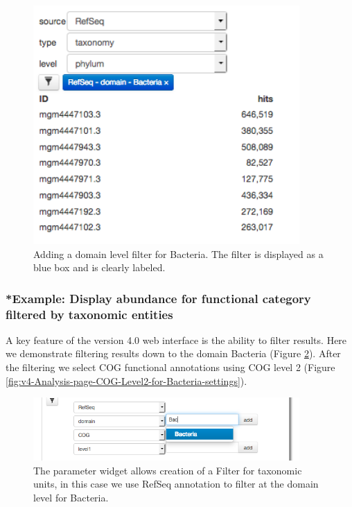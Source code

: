 \documentclass[12pt,fullpage]{report}
\begin{document}
\begin{figure}
\begin{center}
\includegraphics[width=4in]{Images/v4-analysis-page-domain-filter.png}
\end{center}
\caption{
Adding a domain level filter for Bacteria. The filter is displayed as a blue box and is clearly labeled.
}
\label{fig:v4-analysis-page-domain-filter}
\end{figure}


\subsubsection{*Example: Display abundance for functional category filtered by taxonomic entities}

A key feature of the version 4.0 web interface is the ability to filter results. Here we demonstrate filtering results down to the domain Bacteria (Figure \ref{fig:v4-Analysis-page-filtering-for-Bacteria-settings}). After the filtering we select COG functional annotations using COG level 2 (Figure \ref{fig:v4-Analysis-page-COG-Level2-for-Bacteria-settings}).


\begin{figure}
\begin{center}
\includegraphics[width=4in]{Images/v4-Analysis-page-filtering-for-Bacteria-settings.png}
\end{center}
\caption{
The parameter widget allows creation of a Filter for taxonomic units, in this case we use RefSeq annotation to filter at the domain level for Bacteria.}
\label{fig:v4-Analysis-page-filtering-for-Bacteria-settings}
\end{figure}
\end{document}

